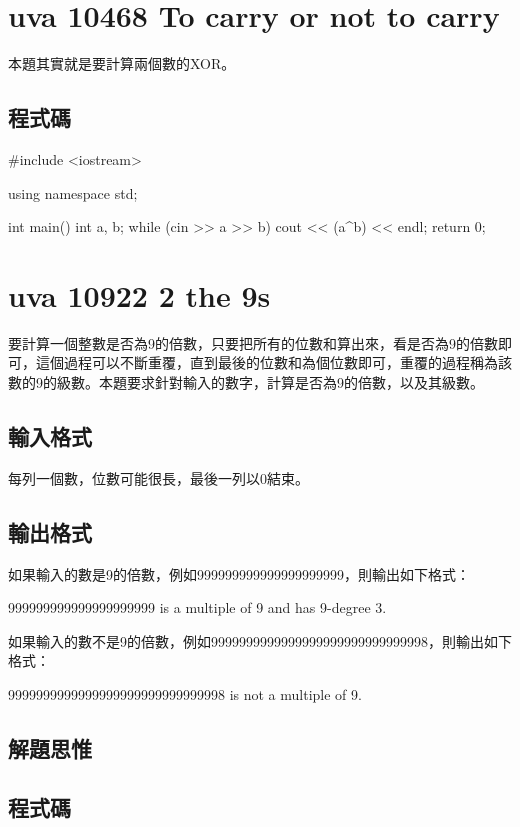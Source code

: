 \section{uva 10468 To carry or not to carry}
本題其實就是要計算兩個數的XOR。

\subsection{程式碼}
\begin{cppcode}
	#include <iostream>
	
	using namespace std;
	
	int main()
	{
		int a, b;
		while (cin >> a >> b) {
			cout << (a^b) << endl;
		}
		return 0;
	}
\end{cppcode}

\section{uva 10922 2 the 9s}
要計算一個整數是否為9的倍數，只要把所有的位數和算出來，看是否為9的倍數即可，這個過程可以不斷重覆，直到最後的位數和為個位數即可，重覆的過程稱為該數的9的級數。本題要求針對輸入的數字，計算是否為9的倍數，以及其級數。
\subsection{輸入格式}
每列一個數，位數可能很長，最後一列以0結束。
\subsection{輸出格式}
如果輸入的數是9的倍數，例如999999999999999999999，則輸出如下格式：
\begin{inside}
999999999999999999999 is a multiple of 9 and has 9-degree 3.
\end{inside}
如果輸入的數不是9的倍數，例如9999999999999999999999999999998，則輸出如下格式：
\begin{inside}
9999999999999999999999999999998 is not a multiple of 9.
\end{inside}
\subsection{解題思惟}

\subsection{程式碼}

